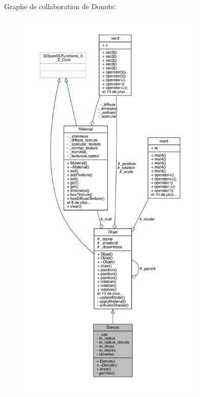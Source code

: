 Graphe de collaboration de Donuts\+:
\nopagebreak
\begin{figure}[H]
\begin{center}
\leavevmode
\includegraphics[height=550pt]{class_donuts__coll__graph}
\end{center}
\end{figure}
